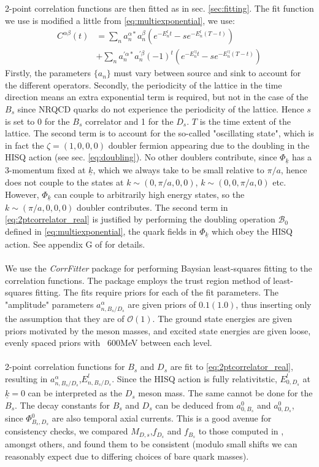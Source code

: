 2-point correlation functions are then fitted as in sec. \ref{sec:fitting}. The fit function we use is modified a little from \eqref{eq:multiexponential}, we use:
\begin{align}
	\nonumber
	C^{\alpha\beta}(t) &= \sum_{n} a^{\alpha*}_n  a^{\beta}_n ( e^{-E^l_n t} - se^{-E^l_n(T-t)} )\\
	& + \sum_{n} a^{'\alpha*}_n a^{'\beta}_n (-1)^t ( e^{-E^{'l}_n t} - se^{-E^{'l}_n(T-t)} )
	\label{eq:2ptcorrelator_real}
\end{align}
Firstly, the parameters $\{a_n\}$ must vary between source and sink to account for the different operators. Secondly, the periodicity of the lattice in the time direction means an extra exponential term is required, but not in the case of the $B_s$ since NRQCD quarks do not experience the periodicity of the lattice. Hence $s$ is set to 0 for the $B_s$ correlator and 1 for the $D_s$. $T$ is the time extent of the lattice. The second term is to account for the so-called "oscillating state", which is in fact the $\zeta=(1,0,0,0)$ doubler fermion appearing due to the doubling in the HISQ action (see sec. \ref{eq:doubling}). No other doublers contribute, since $\Phi_{\underline{k}}$ has a 3-momentum fixed at $\underline{k}$, which we always take to be small relative to $\pi/a$, hence does not couple to the states at $k\sim(0,\pi/a,0,0)$, $k\sim(0,0,\pi/a,0)$ etc. However, $\Phi_{\underline{k}}$ can couple to arbitrarily high energy states, so the $k\sim(\pi/a,0,0,0)$ doubler contributes. The second term in \eqref{eq:2ptcorrelator_real} is justified by performing the doubling operation $\mathcal{B}_0$ defined in \eqref{eq:multiexponential}, the quark fields in $\Phi_{\underline{k}}$ which obey the HISQ action. See appendix G of \cite{Follana:2006rc} for details.
\\ \\
We use the \textit{CorrFitter} package \cite{CorrFitter} for performing Baysian least-squares fitting to the correlation functions. The package employs the trust region method of least-squares fitting. The fits require priors for each of the fit parameters. The "amplitude" parameters $a_{n,B_s/D_s}^{\alpha}$ are given priors of $0.1(1.0)$, thus inserting only the assumption that they are of $\mathcal{O}(1)$. The ground state energies are given priors motivated by the meson masses, and excited state energies are given loose, evenly spaced priors with ~600MeV between each level.
\\ \\
2-point correlation functions for $B_s$ and $D_s$ are fit to \eqref{eq:2ptcorrelator_real}, resulting in $a^{\alpha}_{n,B_s/D_s}$,$E^l_{n,B_s/D_s}$. Since the HISQ action is fully relativitstic, $E^l_{0,D_s}$ at $\underline{k}=0$ can be interpreted as the $D_s$ meson mass. The same cannot be done for the $B_s$. The decay constants for $B_s$ and $D_s$ can be deduced from $a^0_{0,B_s}$ and $a^0_{0,D_s}$, since $\Phi^0_{B_s,D_s}$ are also temporal axial currents. This is a good avenue for consistency checks, we compared $M_{D,s}$,$f_{D_s}$ and $f_{B_s}$ to those computed in \cite{Colquhoun:2015oha},\cite{Monahan:2017uby} amongst others, and found them to be consistent (modulo small shifts we can reasonably expect due to differing choices of bare quark masses).
